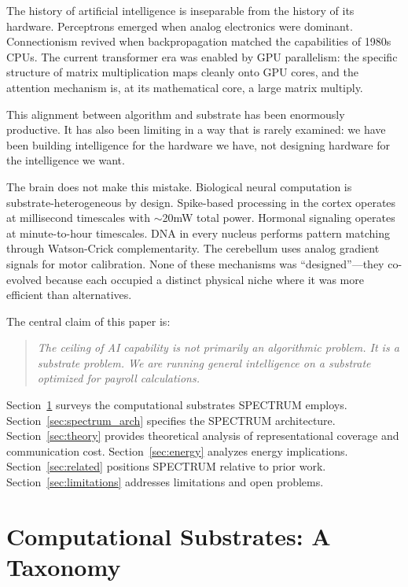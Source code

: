 \documentclass[12pt]{article}
\begin{document}
The history of artificial intelligence is inseparable from the history of its hardware. Perceptrons emerged when analog electronics were dominant. Connectionism revived when backpropagation matched the capabilities of 1980s CPUs. The current transformer era \cite{vaswani2017} was enabled by GPU parallelism: the specific structure of matrix multiplication maps cleanly onto GPU cores, and the attention mechanism is, at its mathematical core, a large matrix multiply.

This alignment between algorithm and substrate has been enormously productive. It has also been limiting in a way that is rarely examined: we have been building intelligence for the hardware we have, not designing hardware for the intelligence we want.

The brain does not make this mistake. Biological neural computation is substrate-heterogeneous by design. Spike-based processing in the cortex operates at millisecond timescales with $\sim$20mW total power. Hormonal signaling operates at minute-to-hour timescales. DNA in every nucleus performs pattern matching through Watson-Crick complementarity. The cerebellum uses analog gradient signals for motor calibration. None of these mechanisms was ``designed''---they co-evolved because each occupied a distinct physical niche where it was more efficient than alternatives.

The central claim of this paper is:

\begin{quote}
\textit{The ceiling of AI capability is not primarily an algorithmic problem. It is a substrate problem. We are running general intelligence on a substrate optimized for payroll calculations.}
\end{quote}

Section~\ref{sec:substrates} surveys the computational substrates SPECTRUM employs. Section~\ref{sec:spectrum_arch} specifies the SPECTRUM architecture. Section~\ref{sec:theory} provides theoretical analysis of representational coverage and communication cost. Section~\ref{sec:energy} analyzes energy implications. Section~\ref{sec:related} positions SPECTRUM relative to prior work. Section~\ref{sec:limitations} addresses limitations and open problems.

\section{Computational Substrates: A Taxonomy}
\label{sec:substrates}
\end{document}
